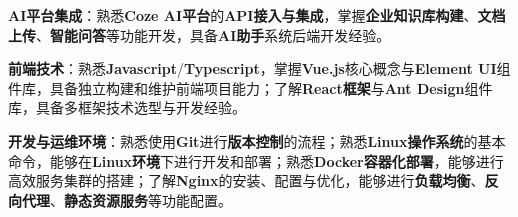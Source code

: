 \item \textbf{AI平台集成}：熟悉\textbf{Coze AI平台}的\textbf{API接入与集成}，掌握\textbf{企业知识库构建}、\textbf{文档上传}、\textbf{智能问答}等功能开发，具备\textbf{AI助手}系统后端开发经验。
\item \textbf{前端技术}：熟悉\textbf{Javascript}/\textbf{Typescript}，掌握\textbf{Vue.js}核心概念与\textbf{Element UI}组件库，具备独立构建和维护前端项目能力；了解\textbf{React框架}与\textbf{Ant Design}组件库，具备多框架技术选型与开发经验。
\item \textbf{开发与运维环境}：熟悉使用\textbf{Git}进行\textbf{版本控制}的流程；熟悉\textbf{Linux操作系统}的基本命令，能够在\textbf{Linux环境}下进行开发和部署；熟悉\textbf{Docker容器化部署}，能够进行高效服务集群的搭建；了解\textbf{Nginx}的安装、配置与优化，能够进行\textbf{负载均衡}、\textbf{反向代理}、\textbf{静态资源服务}等功能配置。
